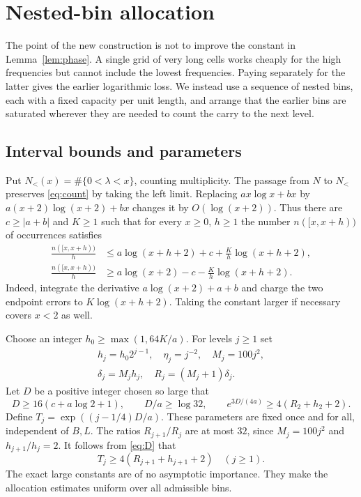 \documentclass[11pt,letterpaper]{article}
\theoremstyle{remark}\newtheorem{remark}[theorem]{Remark}
\begin{document}
\section{Nested-bin allocation}\label{sec:allocation}
The point of the new construction is not to improve the constant in Lemma~\ref{lem:phase}. A single grid of very long cells works cheaply for the high frequencies but cannot include the lowest frequencies. Paying separately for the latter gives the earlier logarithmic loss. We instead use a sequence of nested bins, each with a fixed capacity per unit length, and arrange that the earlier bins are saturated wherever they are needed to count the carry to the next level.

\subsection{Interval bounds and parameters}
Put $N_<(x)=\#\{0<\lambda<x\}$, counting multiplicity. The passage from $N$ to $N_<$ preserves \eqref{eq:count} by taking the left limit. Replacing $a x\log x+b x$ by $a(x+2)\log(x+2)+b x$ changes it by $O(\log(x+2))$. Thus there are $c\ge |a+b|$ and $K\ge1$ such that for every $x\ge0$, $h\ge1$ the number $n([x,x+h))$ of occurrences satisfies
\begin{align}
 \frac{n([x,x+h))}{h}&\le a\log(x+h+2)+c+\frac K h\log(x+h+2),\label{eq:upbin}\\
 \frac{n([x,x+h))}{h}&\ge a\log(x+2)-c-\frac K h\log(x+h+2).\label{eq:lowbin}
\end{align}
Indeed, integrate the derivative $a\log(x+2)+a+b$ and charge the two endpoint errors to $K\log(x+h+2)$. Taking the constant larger if necessary covers $x<2$ as well.

Choose an integer $h_0\ge\max(1,64K/a)$. For levels $j\ge1$ set
\begin{equation}\label{eq:params}
 \begin{gathered}
 h_j=h_0 2^{j-1},\quad \eta_j=j^{-2},\quad M_j=100j^2,\\
 \delta_j=M_jh_j,\quad R_j=(M_j+1)\delta_j .
 \end{gathered}
\end{equation}
Let $D$ be a positive integer chosen so large that
\begin{equation}\label{eq:D}
 D\ge16(c+a\log2+1),\qquad D/a\ge\log32,\qquad
 e^{3D/(4a)}\ge4(R_2+h_2+2).
\end{equation}
Define $T_j=\exp((j-1/4)D/a)$. These parameters are fixed once and for all, independent of $B,L$. The ratios $R_{j+1}/R_j$ are at most $32$, since $M_j=100j^2$ and $h_{j+1}/h_j=2$. It follows from \eqref{eq:D} that
\begin{equation}\label{eq:Tlarge}
 T_j\ge4(R_{j+1}+h_{j+1}+2)\quad(j\ge1).
\end{equation}
The exact large constants are of no asymptotic importance. They make the allocation estimates uniform over all admissible bins.
\end{document}
